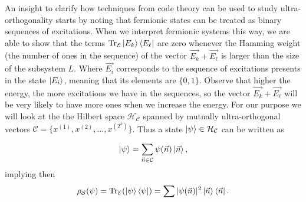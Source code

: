 \indent An insight to clarify how techniques from code theory can be used to study ultra-orthogonality starts by noting that fermionic states can be treated as binary sequences of excitations. When we interpret fermionic systems this way, we are able to show that the terms $\operatorname{Tr}_{\mathcal{E}} \mathinner{|{E_k}\rangle}\mathinner{\langle{E_\ell}|} $ are zero whenever the Hamming weight (the number of ones in the sequence) of the vector $\vec{E_k}+\vec{E_\ell}$ is larger than the size of the subsystem $L$. Where $\vec{E_i}$ corresponds to the sequence of excitations presents in the state $ \mathinner{|{E_i}\rangle}$, meaning that its elements are $\{0,1\}$. Observe that higher the energy, the more excitations we have in the sequences, so the vector $\vec{E_k}+\vec{E_\ell}$ will be very likely to have more ones when we increase the energy. For our purpose we will look at the the Hilbert space $\mathcal{H}_{\mathcal{C}}$ spanned by mutually ultra-orthogonal vectors $\mathcal{C}=\{x^{(1)},x^{(2)},\ldots, x^{(2^k)}\}$. Thus a state $\mathinner{|{\psi}\rangle}\in \mathcal{H}_{\mathcal{C}}$ can be written as

\begin{equation}
\mathinner{|{\psi}\rangle} = \sum_{\vec{n}\in \mathcal{C}}\psi(\vec{n})\mathinner{|{\vec{n}}\rangle},
\end{equation}
implying then
\begin{equation}
\rho_{\mathcal{S}}(\psi) = \operatorname{Tr}_{\mathcal{E}}(\mathinner{|{\psi}\rangle}\mathinner{\langle{\psi}|}) = \sum |\psi(\vec{n})|^2 \mathinner{|{\vec{n}}\rangle}\mathinner{\langle{\vec{n}}|}.
\end{equation}

